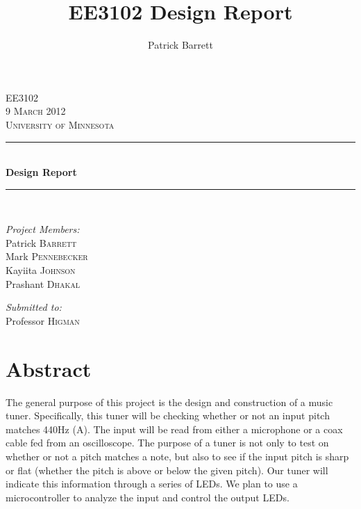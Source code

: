 \documentclass[12pt]{article}
\title{EE3102 Design Report} %
\author{Patrick Barrett}
\date{}                                           %
\newcommand{\HRule}{\rule{\linewidth}{0.5mm}}
\begin{document}
\begin{singlespace}

\begin{center}
 
 

 
\textsc{\LARGE EE3102}\\[0.5cm]
 

\textsc{\Large 9 March 2012}\\[0.5cm]

\textsc{\Large University of Minnesota}\\[0.5cm]
 
 
\HRule \\[0.4cm]
{ \huge \bfseries Design Report}\\
 
\HRule \\[1cm]
 
\begin{minipage}{0.4\textwidth}
\begin{flushleft} \large
\emph{Project Members:}\\
Patrick \textsc{Barrett} \\
Mark \textsc{Pennebecker} \\
Kayiita  \textsc{Johnson} \\
Prashant \textsc{Dhakal} \\
\end{flushleft}
\end{minipage}
\begin{minipage}{0.4\textwidth}
\begin{flushright} \large
\emph{Submitted to:} \\
Professor \textsc{Higman}\\
\end{flushright}
\end{minipage}
\end{center}

\vfill

\section*{Abstract}
The general purpose of this project is the design and construction of a music tuner. Specifically, this
tuner will be checking whether or not an input pitch matches 440Hz (A). The input will be read from
either a microphone or a coax cable fed from an oscilloscope. The purpose of a tuner is not only to test
on whether or not a pitch matches a note, but also to see if the input pitch is sharp or flat (whether the
pitch is above or below the given pitch). Our tuner will indicate this information through a series of
LEDs. We plan to use a microcontroller to analyze the input and control the output LEDs.
\end{singlespace}
\end{document}
